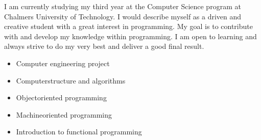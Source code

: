 I am currently studying my third year at the Computer Science program at Chalmers University 
of Technology. I would describe myself as a driven and creative student with a great interest 
in programming. My goal is to contribute with and develop my knowledge within programming. 
I am open to learning and always strive to do my very best and deliver a good final result.


\begin{itemize}
    \item Computer engineering project
    \item Computerstructure and algorithms
    \item Objectoriented programming
    \item Machineoriented programming
    \item Introduction to functional programming
\end{itemize}








